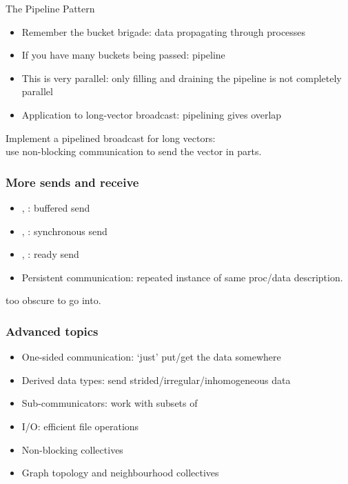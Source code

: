 \begin{frame}[containsverbatim]{The Pipeline Pattern}
  \begin{itemize}
  \item Remember the bucket brigade: data propagating through
    processes
  \item If you have many buckets being passed: pipeline
  \item This is very parallel: only filling and draining the pipeline
    is not completely parallel
  \item Application to long-vector broadcast: pipelining gives overlap
  \end{itemize}
\end{frame}

\begin{optexerciseframe}[bucketpipenonblock]
  Implement a pipelined broadcast for long vectors:\\
  use non-blocking communication to send the vector in parts.
\end{optexerciseframe}

\begin{frame}[containsverbatim]\frametitle{More sends and receive}
  \begin{itemize}
  \item {}, : buffered send
  \item {}, : synchronous send
  \item {}, : ready send
  \item Persistent communication: repeated instance of same proc/data description.
  \end{itemize}
  too obscure to go into.
\end{frame}

\begin{frame}[containsverbatim]\frametitle{Advanced topics}
  \begin{itemize}
  \item One-sided communication: `just' put/get the data somewhere
  \item Derived data types: send strided/irregular/inhomogeneous data
  \item Sub-communicators: work with subsets of 
  \item I/O: efficient file operations
  \item Non-blocking collectives
  \item Graph topology and neighbourhood collectives
  \end{itemize}
\end{frame}

\endinput

\begin{frame}[containsverbatim]\frametitle{}
\begin{lstlisting}
  
\end{lstlisting}
\end{frame}


